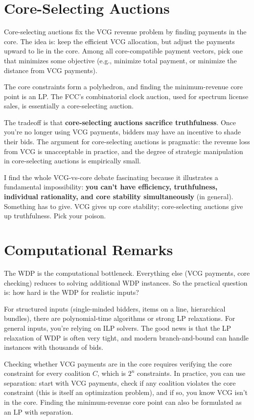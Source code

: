 \documentclass[11pt]{article}
\begin{document}
\section{Core-Selecting Auctions}

Core-selecting auctions fix the VCG revenue problem by finding payments in the core. The idea is: keep the efficient VCG allocation, but adjust the payments upward to lie in the core. Among all core-compatible payment vectors, pick one that minimizes some objective (e.g., minimize total payment, or minimize the distance from VCG payments).

The core constraints form a polyhedron, and finding the minimum-revenue core point is an LP. The FCC's combinatorial clock auction, used for spectrum license sales, is essentially a core-selecting auction.

The tradeoff is that \textbf{core-selecting auctions sacrifice truthfulness}. Once you're no longer using VCG payments, bidders may have an incentive to shade their bids. The argument for core-selecting auctions is pragmatic: the revenue loss from VCG is unacceptable in practice, and the degree of strategic manipulation in core-selecting auctions is empirically small.

I find the whole VCG-vs-core debate fascinating because it illustrates a fundamental impossibility: \textbf{you can't have efficiency, truthfulness, individual rationality, and core stability simultaneously} (in general). Something has to give. VCG gives up core stability; core-selecting auctions give up truthfulness. Pick your poison.

\section{Computational Remarks}

The WDP is the computational bottleneck. Everything else (VCG payments, core checking) reduces to solving additional WDP instances. So the practical question is: how hard is the WDP for realistic inputs?

For structured inputs (single-minded bidders, items on a line, hierarchical bundles), there are polynomial-time algorithms or strong LP relaxations. For general inputs, you're relying on ILP solvers. The good news is that the LP relaxation of WDP is often very tight, and modern branch-and-bound can handle instances with thousands of bids.

Checking whether VCG payments are in the core requires verifying the core constraint for every coalition $C$, which is $2^n$ constraints. In practice, you can use separation: start with VCG payments, check if any coalition violates the core constraint (this is itself an optimization problem), and if so, you know VCG isn't in the core. Finding the minimum-revenue core point can also be formulated as an LP with separation.
\end{document}
